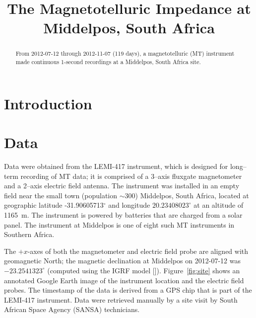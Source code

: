 \documentclass[draft,linenumbers]{agujournal2018}
\begin{document}
\title{The Magnetotelluric Impedance at Middelpos, South Africa}





\begin{keypoints}
\item 
\item 
\item 
\end{keypoints}

\begin{abstract}
From 2012-07-12 through 2012-11-07 (119 days), a magnetotelluric (MT) instrument made continuous 1-second recordings at a Middelpos, South Africa site.
\end{abstract}

\section{Introduction}

\section{Data}
\label{section:Data}

Data were obtained from the LEMI-417 instrument, which is designed for long--term recording of MT data; it is comprised of a 3--axis fluxgate magnetometer and a 2--axis electric field antenna. The instrument was installed in an empty field near the small town (population $\sim$300) Middelpos, South Africa, located at geographic latitude -31.90605713$^\circ$ and longitude $20.23408023^\circ$ at an altitude of 1165~m. The instrument is powered by batteries that are charged from a solar panel. The instrument at Middelpos is one of eight such MT instruments in Southern Africa.

The $+x$-axes of both the magnetometer and electric field probe are aligned with geomagnetic North; the magnetic declination at Middelpos on 2012-07-12 was $-23.2541323^\circ$ (computed using the IGRF model [\cite{igrf}]). Figure~\ref{fig:site} shows an annotated Google Earth image of the instrument location and the electric field probes. The timestamp of the data is derived from a GPS chip that is part of the LEMI-417 instrument. Data were retrieved manually by a site visit by South African Space Agency (SANSA) technicians. 
\end{document}
